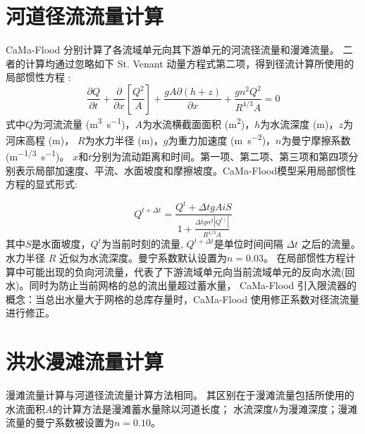 \section{河道径流流量计算}
CaMa-Flood 分别计算了各流域单元向其下游单元的河流径流量和漫滩流量。
二者的计算均通过忽略如下 St. Venant 动量方程式第二项，得到径流计算所使用的局部惯性方程 \cite{bates2010}:
\begin{equation}
\frac{\partial Q}{\partial t}+\frac{\partial}{\partial x}\left[\frac{Q^{2}}{A}\right]+\frac{g A \partial(h+z)}{\partial x}+\frac{g n^{2} Q^{2}}{R^{4 / 3} A}=0
\end{equation}
式中$Q$为河流流量 (\unit{m^3.s^{-1}})，$A$为水流横截面面积 (\unit{m^2})，$h$为水流深度 (m)，$z$为河床高程 (m)，
$R$为水力半径 (m)，$g$为重力加速度 (\unit{m.s^{-2}})，$n$为曼宁摩擦系数(\unit{m^{-1/3}.s^{-1}})。
$x$和$t$分别为流动距离和时间。第一项、第二项、第三项和第四项分别表示局部加速度、平流、水面坡度和摩擦坡度。CaMa-Flood模型采用局部惯性方程的显式形式: 

\begin{equation}
Q^{t+\Delta t}=\frac{Q^{t}+\Delta t g A i S}{1+\frac{\Delta t g n^{2}\left|Q^{t \mid}\right|}{R^{4 / 3} A}}
\end{equation}
其中$S$是水面坡度，$Q^t$为当前时刻的流量, $Q^{t+\Delta t}$是单位时间间隔 $\Delta t$ 之后的流量。水力半径 $R$ 近似为水流深度。曼宁系数默认设置为$n=0.03$。
在局部惯性方程计算中可能出现的负向河流量，代表了下游流域单元向当前流域单元的反向水流(回水)。同时为防止当前网格的总的流出量超过蓄水量，
CaMa-Flood 引入限流器的概念：当总出水量大于网格的总库存量时，CaMa-Flood 使用修正系数对径流流量进行修正。


\section{洪水漫滩流量计算}
漫滩流量计算与河道径流流量计算方法相同。
其区别在于漫滩流量包括所使用的水流面积$A$的计算方法是漫滩蓄水量除以河道长度；
水流深度$h$为漫滩深度；漫滩流量的曼宁系数被设置为$n=0.10$。

